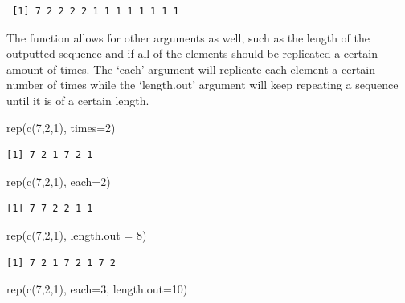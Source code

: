 \documentclass[
  letterpaper,
  DIV=11,
  numbers=noendperiod]{scrreprt}
\newenvironment{Shaded}{\begin{snugshade}}{\end{snugshade}}
\newcommand{\AttributeTok}[1]{\textcolor[rgb]{0.40,0.45,0.13}{#1}}
\newcommand{\DecValTok}[1]{\textcolor[rgb]{0.68,0.00,0.00}{#1}}
\newcommand{\FunctionTok}[1]{\textcolor[rgb]{0.28,0.35,0.67}{#1}}
\newcommand{\NormalTok}[1]{\textcolor[rgb]{0.00,0.23,0.31}{#1}}
\begin{document}
\begin{verbatim}
 [1] 7 2 2 2 2 1 1 1 1 1 1 1 1
\end{verbatim}

The function allows for other arguments as well, such as the length of
the outputted sequence and if all of the elements should be replicated a
certain amount of times. The `each' argument will replicate each element
a certain number of times while the `length.out' argument will keep
repeating a sequence until it is of a certain length.

\begin{Shaded}
\begin{Highlighting}[]
\FunctionTok{rep}\NormalTok{(}\FunctionTok{c}\NormalTok{(}\DecValTok{7}\NormalTok{,}\DecValTok{2}\NormalTok{,}\DecValTok{1}\NormalTok{), }\AttributeTok{times=}\DecValTok{2}\NormalTok{)}
\end{Highlighting}
\end{Shaded}

\begin{verbatim}
[1] 7 2 1 7 2 1
\end{verbatim}

\begin{Shaded}
\begin{Highlighting}[]
\FunctionTok{rep}\NormalTok{(}\FunctionTok{c}\NormalTok{(}\DecValTok{7}\NormalTok{,}\DecValTok{2}\NormalTok{,}\DecValTok{1}\NormalTok{), }\AttributeTok{each=}\DecValTok{2}\NormalTok{)}
\end{Highlighting}
\end{Shaded}

\begin{verbatim}
[1] 7 7 2 2 1 1
\end{verbatim}

\begin{Shaded}
\begin{Highlighting}[]
\FunctionTok{rep}\NormalTok{(}\FunctionTok{c}\NormalTok{(}\DecValTok{7}\NormalTok{,}\DecValTok{2}\NormalTok{,}\DecValTok{1}\NormalTok{), }\AttributeTok{length.out =} \DecValTok{8}\NormalTok{)}
\end{Highlighting}
\end{Shaded}

\begin{verbatim}
[1] 7 2 1 7 2 1 7 2
\end{verbatim}

\begin{Shaded}
\begin{Highlighting}[]
\FunctionTok{rep}\NormalTok{(}\FunctionTok{c}\NormalTok{(}\DecValTok{7}\NormalTok{,}\DecValTok{2}\NormalTok{,}\DecValTok{1}\NormalTok{), }\AttributeTok{each=}\DecValTok{3}\NormalTok{, }\AttributeTok{length.out=}\DecValTok{10}\NormalTok{)}
\end{Highlighting}
\end{Shaded}
\end{document}
